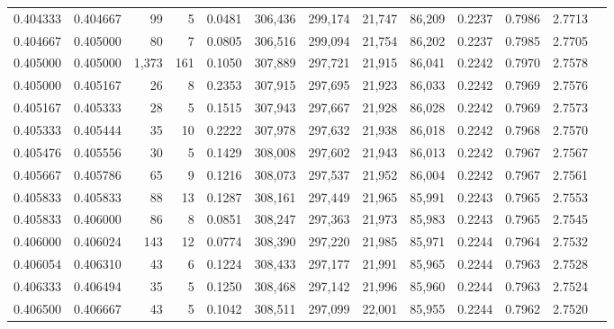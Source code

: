 \begin{tabular}{rrrrrrrrrrrrr}
0.404333 & 0.404667 &    99 &   5 &                                     0.0481 & 306,436 & 299,174 &  21,747 &  86,209 & 0.2237 & 0.7986 & 2.7713 \\
0.404667 & 0.405000 &    80 &   7 &                                     0.0805 & 306,516 & 299,094 &  21,754 &  86,202 & 0.2237 & 0.7985 & 2.7705 \\
0.405000 & 0.405000 & 1,373 & 161 &                                     0.1050 & 307,889 & 297,721 &  21,915 &  86,041 & 0.2242 & 0.7970 & 2.7578 \\
0.405000 & 0.405167 &    26 &   8 &                                     0.2353 & 307,915 & 297,695 &  21,923 &  86,033 & 0.2242 & 0.7969 & 2.7576 \\
0.405167 & 0.405333 &    28 &   5 &                                     0.1515 & 307,943 & 297,667 &  21,928 &  86,028 & 0.2242 & 0.7969 & 2.7573 \\
0.405333 & 0.405444 &    35 &  10 &                                     0.2222 & 307,978 & 297,632 &  21,938 &  86,018 & 0.2242 & 0.7968 & 2.7570 \\
0.405476 & 0.405556 &    30 &   5 &                                     0.1429 & 308,008 & 297,602 &  21,943 &  86,013 & 0.2242 & 0.7967 & 2.7567 \\
0.405667 & 0.405786 &    65 &   9 &                                     0.1216 & 308,073 & 297,537 &  21,952 &  86,004 & 0.2242 & 0.7967 & 2.7561 \\
0.405833 & 0.405833 &    88 &  13 &                                     0.1287 & 308,161 & 297,449 &  21,965 &  85,991 & 0.2243 & 0.7965 & 2.7553 \\
0.405833 & 0.406000 &    86 &   8 &                                     0.0851 & 308,247 & 297,363 &  21,973 &  85,983 & 0.2243 & 0.7965 & 2.7545 \\
0.406000 & 0.406024 &   143 &  12 &                                     0.0774 & 308,390 & 297,220 &  21,985 &  85,971 & 0.2244 & 0.7964 & 2.7532 \\
0.406054 & 0.406310 &    43 &   6 &                                     0.1224 & 308,433 & 297,177 &  21,991 &  85,965 & 0.2244 & 0.7963 & 2.7528 \\
0.406333 & 0.406494 &    35 &   5 &                                     0.1250 & 308,468 & 297,142 &  21,996 &  85,960 & 0.2244 & 0.7963 & 2.7524 \\
0.406500 & 0.406667 &    43 &   5 &                                     0.1042 & 308,511 & 297,099 &  22,001 &  85,955 & 0.2244 & 0.7962 & 2.7520 \\

\end{tabular}

